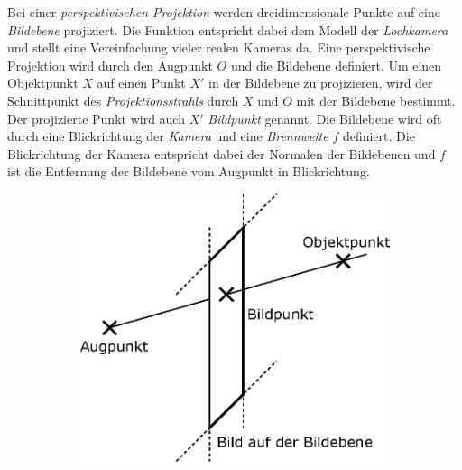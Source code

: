 \documentclass[ngerman,a4paper,parskip=half]{scrartcl}
\begin{document}
Bei einer \emph{perspektivischen Projektion} werden dreidimensionale Punkte auf eine \emph{Bildebene} projiziert. Die Funktion entspricht dabei dem Modell der \emph{Lochkamera} und stellt eine Vereinfachung vieler realen Kameras da. Eine perspektivische Projektion wird durch den Augpunkt $O$ und die Bildebene definiert. Um einen Objektpunkt $X$ auf einen Punkt $X'$ in der Bildebene zu projizieren, wird der Schnittpunkt des \emph{Projektionsstrahls} durch $X$ und $O$ mit der Bildebene bestimmt. Der projizierte Punkt wird auch $X'$ \emph{Bildpunkt} genannt. Die Bildebene wird oft durch eine Blickrichtung der \emph{Kamera} und eine \emph{Brennweite} $f$ definiert. Die Blickrichtung der Kamera entspricht dabei der Normalen der Bildebenen und $f$ ist die Entfernung der Bildebene vom Augpunkt in Blickrichtung.

\begin{figure}
	\centering
	\begin{subfigure}{0.4\textwidth}
		\includegraphics[width=\textwidth]{includes/perspective}
	\end{subfigure}
	\hfill
	\begin{subfigure}{0.4\textwidth}

\end{subfigure}
\end{figure}
\end{document}
